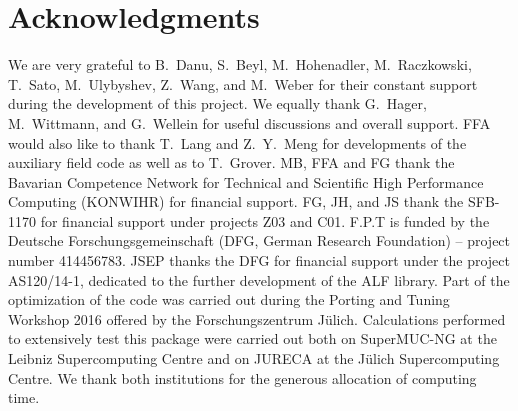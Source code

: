 

\section*{Acknowledgments} 

%

We are very grateful to  B.~Danu, S.~Beyl, M.~Hohenadler,  M.~Raczkowski, T.~Sato,  M.~Ulybyshev, Z.~Wang, and M.~Weber for their constant support during the development of this project.
We equally thank G.~Hager, M.~Wittmann, and G.~Wellein for useful discussions and overall support.
FFA would also like to thank T.~Lang  and Z.~Y.~Meng for developments of the auxiliary field code as well as to T.~Grover. 
MB, FFA  and FG thank the Bavarian Competence Network for Technical and Scientific High Performance Computing (KONWIHR) for financial support.
FG, JH, and JS thank the SFB-1170 for  financial support under projects Z03 and C01.
F.P.T is funded by the Deutsche Forschungsgemeinschaft (DFG, German Research Foundation) -- project number 414456783.
JSEP  thanks the DFG for financial support under the project AS120/14-1, dedicated to the further development of the ALF library.
Part of the optimization of the code was carried out during  the  Porting and Tuning Workshop 2016 offered by the Forschungszentrum J\"ulich.
Calculations performed to extensively test this package were carried out both on  SuperMUC-NG at the  Leibniz Supercomputing Centre and on  JURECA  \cite{Jureca16} at the J\"ulich Supercomputing Centre.  We thank both institutions for the generous allocation of computing time.
